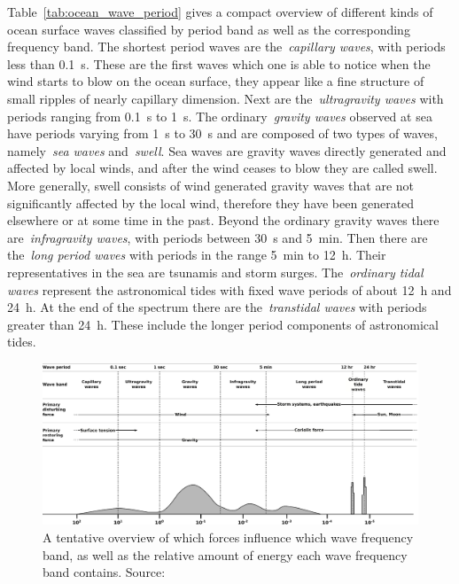Table~\ref{tab:ocean_wave_period} gives a compact overview of different kinds 
of ocean surface waves classified by period band as well as the corresponding 
frequency band. The shortest period waves are the~\emph{capillary waves}, with 
periods less than \SI{0.1}{\second}. These are the first waves which one is able to notice 
when the wind starts to blow on the ocean surface, they appear like a fine
structure of small ripples of nearly capillary dimension.
Next are the~\emph{ultragravity waves} with periods ranging from \SI{0.1}{\second}
to \SI{1}{\second}. The ordinary~\emph{gravity waves} observed at sea have periods
varying from \SI{1}{\second} to \SI{30}{\second} and are composed of two types
of waves, namely~\emph{sea waves} and~\emph{swell}.
Sea waves are gravity waves directly generated and affected by local winds,
and after the wind ceases to blow they are called swell.
More generally, swell
consists of wind generated gravity waves that are not significantly affected
by the local wind, therefore they have  been generated elsewhere or at some
time in the past.
Beyond the ordinary 
gravity waves there are~\emph{infragravity waves}, with periods between \SI{30}{\second} 
and \SI{5}{\minute}. Then there are the~\emph{long period waves} with periods in the 
range \SI{5}{\minute} to \SI{12}{\hour}. Their representatives in the sea are tsunamis 
and storm surges. The~\emph{ordinary tidal waves} represent the astronomical 
tides with fixed wave periods of about \SI{12}{\hour} and \SI{24}{\hour}. At the end of the 
spectrum there are the~\emph{transtidal waves} with periods greater than 
\SI{24}{\hour}. These include the longer period components of astronomical tides.
%
\begin{figure}
  \centering
  \includegraphics[width=\textwidth]{figures/SurfaceWavesEnergy}
  \caption{A tentative overview of which forces influence which wave 
  frequency band, as well as the relative amount of energy
  each wave frequency band contains. Source: \citet{article:munkorigin}}
  \label{fig:surface_waves_energy}
\end{figure}
%

